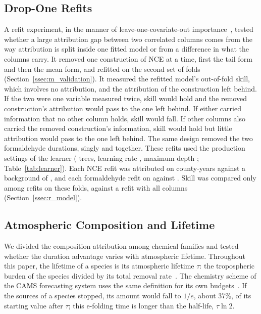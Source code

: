 \documentclass[sensors,article,submit,moreauthors,pdftex]{Definitions/mdpi}
\begin{document}
\subsection{Drop-One Refits}
\label{ssec:m_refit}
A refit experiment, in the manner of leave-one-covariate-out
importance~\cite{Lei2018}, tested whether a large attribution gap between two
correlated columns comes from the way attribution is split inside one fitted model
or from a difference in what the columns carry. It removed one construction of
NCE at a time, first the tail form and then the mean form, and refitted on the
second set of \RefitFolds{} folds (Section~\ref{ssec:m_validation}). It measured
the refitted model's out-of-fold skill, which
involves no attribution, and the attribution of the construction left behind.
If the two were one variable measured twice, skill would hold and the removed
construction's attribution would pass to the one left behind. If either
carried information that no other column holds, skill would fall. If other
columns also carried the removed construction's information, skill would hold but little attribution
would pass to the one left behind. The same design removed the two
formaldehyde durations, singly and together. These refits used the production
settings of the learner (\RefitTrees{} trees, learning rate \RefitLR{}, maximum
depth \RefitDepth{}; Table~\ref{tab:learner}). Each NCE refit was attributed on
\RefitShapN{} county-years against a background of \RefitShapBg{}, and each
formaldehyde refit on \HchoDropShapN{} against \HchoDropShapBg{}. Skill was
compared only among refits on these folds, against a refit with all
\ArmAllN{} columns (Section~\ref{ssec:r_model}).

\subsection{Atmospheric Composition and Lifetime}
\label{ssec:m_lifetime}
We divided the composition attribution among chemical families and tested
whether the duration advantage varies with atmospheric lifetime. Throughout this paper, the lifetime of a species is its
atmospheric lifetime $\tau$: the tropospheric burden of the species divided by
its total removal rate~\cite{Seinfeld2016}. The chemistry scheme of the CAMS forecasting system
uses the same definition for its own budgets~\cite{Flemming2015}.
If the sources of a species stopped, its amount would fall to $1/e$, about
37\%, of its starting value after $\tau$; this e-folding time is longer than
the half-life, $\tau \ln 2$.
\end{document}

